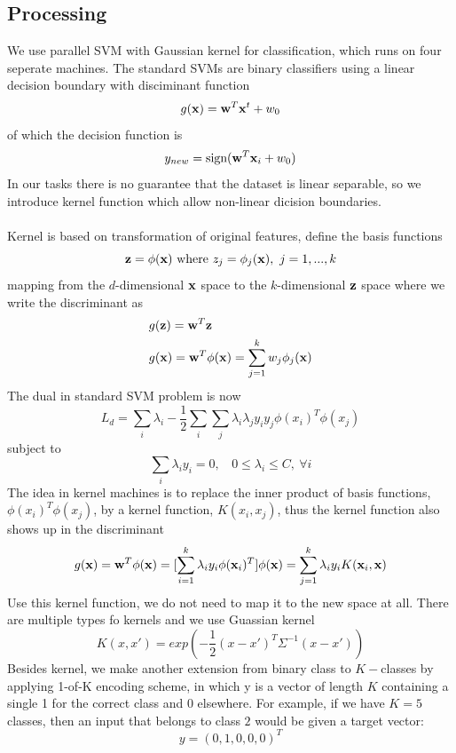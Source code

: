 \documentclass[a4paper]{article}
\newcommand{\vw}{{\bf w}}
\newcommand{\vx}{{\bf x}}
\newcommand{\vz}{{\bf z}}
\begin{document}
\subsection{Processing}
We use parallel SVM with Gaussian kernel for classification, which runs on four seperate machines. The standard SVMs are binary classifiers using a linear decision boundary with disciminant function \begin{equation}
g(\vx)=\vw^T\vx^t+w_0
\end{equation}
of which the decision function is \begin{equation}
y_{new}=\text{sign}(\vw^T\vx_i+w_0)
\end{equation}
In our tasks there is no guarantee that the dataset is linear separable, so we introduce kernel function which allow non-linear dicision boundaries.\\
\\
Kernel is based on transformation of original features, define the basis functions \begin{equation}
\vz =\phi(\vx)~\text{where}~z_j=\phi_j(\vx),~j = 1,...,k
\end{equation}
mapping from the $d$-dimensional $\vx$ space to the $k$-dimensional $\vz$ space where we write the discriminant as\begin{eqnarray}
&g(\vz)=\vw^T\vz\\
&g(\vx)=\vw^T\phi(\vx)=\sum_{j=1}^k w_j\phi_j(\vx)
\end{eqnarray}
The dual in standard SVM problem is now
\begin{equation}
L_d=\sum_i\lambda_i-\frac{1}{2}\sum\limits_i\sum\limits_j \lambda_i\lambda_j y_i y_j \phi(x_i)^T \phi(x_j)
\end{equation}
subject to \begin{equation}
\sum_i \lambda_iy_i=0,~~~~0\leq \lambda_i\leq C,~\forall i
\end{equation}
The idea in kernel machines is to replace the inner product of basis functions, $\phi(x_i)^T\phi(x_j)$, by a kernel function, $K(x_i,x_j)$, thus the kernel function also shows up in the discriminant
\begin{equation}
g(\vx)=\vw^T\phi(\vx)=[\sum_{i=1}^k \lambda_i y_i \phi(\vx_i)^T]\phi(\vx)=\sum_{j=1}^k \lambda_i y_i K(\vx_i,\vx)
\end{equation}
Use this kernel function, we do not need to map it to the new space at all. There are multiple types fo kernels and we use Guassian kernel  \begin{equation}
K(x,x')=exp(-\frac{1}{2}(x-x')^T\Sigma^{-1}(x-x'))
\end{equation}
Besides kernel, we make another extension from binary class to $K-$classes by applying 1-of-K encoding scheme, in which y is a vector of length $K$ containing a single 1 for the correct class and 0 elsewhere. For example, if we have $K=5$ classes, then an input that belongs to class $2$ would be given a target vector: \begin{equation}
y=(0,1,0,0,0)^T
\end{equation}
\end{document}
